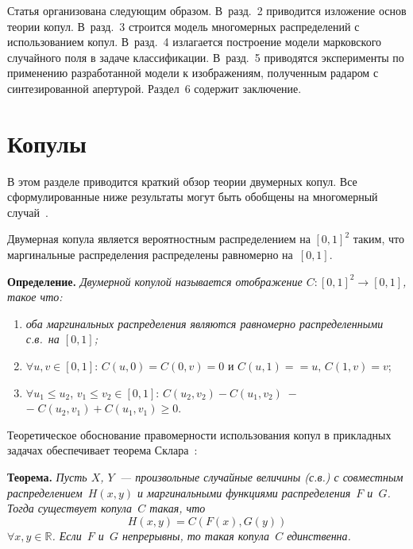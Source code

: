 \begin{multicols}{2}
Статья организована следующим образом. В~разд.~2 приводится изложение основ теории копул. В~разд.~3 
строится модель многомерных распределений с использованием
копул. В~разд.~4 излагается построение модели марковского случайного поля в задаче классификации. В~разд.~5 
приводятся эксперименты по применению разработанной модели к изображениям, полученным радаром с синтезированной 
апертурой. Раздел~6 содержит заключение.


\section{Копулы}

В этом разделе приводится краткий обзор тео\-рии двумерных копул. Все сформулированные ниже результаты 
могут быть обобщены на многомерный случай~\cite{Nelsen}.

Двумерная копула является вероятностным распределением на $[0, 1]^2$ таким, что маргинальные распределения 
распределены равномерно на~$[0,1]$.

\smallskip

\noindent
\textbf{Определение.} \textit{Двумерной копулой называется отображение $C: [0,1]^2 \to [0,1]$, такое что:}
\begin{enumerate}[1)]
\item \textit{оба маргинальных распределения являются равномерно распределенными с.в.\ на $[0,1]$;}
\item
$\forall u, v \in [0,1]$: $C(u,0) = C(0,v) = 0$ и $C(u,1)=$\linebreak $=u,\,C(1,v) = v$;
\item
$\forall u_1 \leq u_2$, $v_1 \leq v_2 \in [0,1]$: $C(u_2,v_2) - C(u_1,v_2)\;-$\linebreak $-\;C(u_2, v_1) + C(u_1, v_1) \geq 0$.
\end{enumerate}

\smallskip

Теоретическое обоснование правомерности использования копул в прикладных задачах обеспечивает 
теорема Склара~\cite{Nelsen}:

\smallskip

\noindent
\textbf{Теорема.} \textit{Пусть $X$, $Y$~--- произвольные случайные величины (с.в.)
с совместным распределением~$H(x,y)$ и маргинальными функциями
распределения~$F$ и~$G$. Тогда существует копула~$C$ такая, что
\begin{equation}
\label{Sklar}
H(x,y) = C\left(F(x), G(y)\right)
\end{equation}
$\forall x, y \in \mathbb R$. Если~$F$ и~$G$ непрерывны, то такая копула~$C$ единственна.}


\end{multicols}
